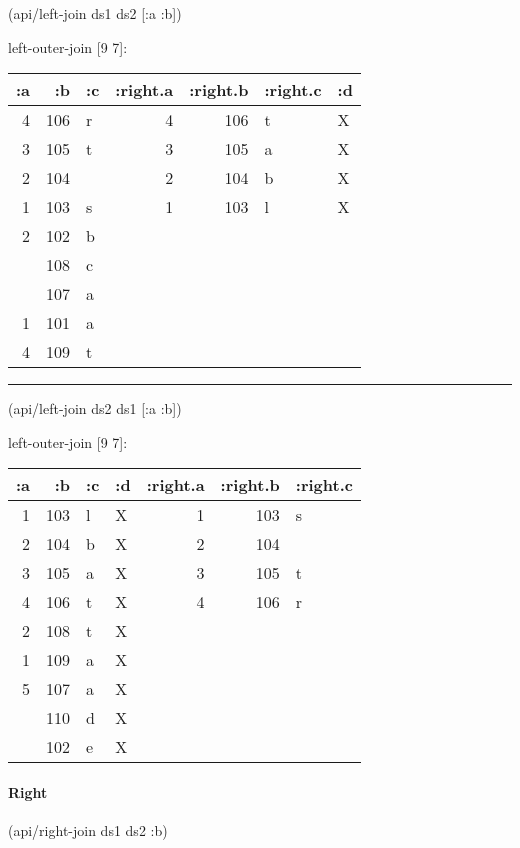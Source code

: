 \documentclass[]{article}
\newenvironment{Shaded}{\begin{snugshade}}{\end{snugshade}}
\newcommand{\AttributeTok}[1]{\textcolor[rgb]{0.77,0.63,0.00}{#1}}
\newcommand{\NormalTok}[1]{#1}
\let\oldparagraph\paragraph
\renewcommand{\paragraph}[1]{\oldparagraph{#1}\mbox{}}
\begin{document}
\begin{Shaded}
\begin{Highlighting}[]
\NormalTok{(api/left-join ds1 ds2 [}\AttributeTok{:a} \AttributeTok{:b}\NormalTok{])}
\end{Highlighting}
\end{Shaded}

left-outer-join {[}9 7{]}:

\begin{longtable}[]{@{}rrlrrll@{}}
\toprule
:a & :b & :c & :right.a & :right.b & :right.c & :d\tabularnewline
\midrule
\endhead
4 & 106 & r & 4 & 106 & t & X\tabularnewline
3 & 105 & t & 3 & 105 & a & X\tabularnewline
2 & 104 & & 2 & 104 & b & X\tabularnewline
1 & 103 & s & 1 & 103 & l & X\tabularnewline
2 & 102 & b & & & &\tabularnewline
& 108 & c & & & &\tabularnewline
& 107 & a & & & &\tabularnewline
1 & 101 & a & & & &\tabularnewline
4 & 109 & t & & & &\tabularnewline
\bottomrule
\end{longtable}

\begin{center}\rule{0.5\linewidth}{0.5pt}\end{center}

\begin{Shaded}
\begin{Highlighting}[]
\NormalTok{(api/left-join ds2 ds1 [}\AttributeTok{:a} \AttributeTok{:b}\NormalTok{])}
\end{Highlighting}
\end{Shaded}

left-outer-join {[}9 7{]}:

\begin{longtable}[]{@{}rrllrrl@{}}
\toprule
:a & :b & :c & :d & :right.a & :right.b & :right.c\tabularnewline
\midrule
\endhead
1 & 103 & l & X & 1 & 103 & s\tabularnewline
2 & 104 & b & X & 2 & 104 &\tabularnewline
3 & 105 & a & X & 3 & 105 & t\tabularnewline
4 & 106 & t & X & 4 & 106 & r\tabularnewline
2 & 108 & t & X & & &\tabularnewline
1 & 109 & a & X & & &\tabularnewline
5 & 107 & a & X & & &\tabularnewline
& 110 & d & X & & &\tabularnewline
& 102 & e & X & & &\tabularnewline
\bottomrule
\end{longtable}

\paragraph{Right}\label{right}

\begin{Shaded}
\begin{Highlighting}[]
\NormalTok{(api/right-join ds1 ds2 }\AttributeTok{:b}\NormalTok{)}
\end{Highlighting}
\end{Shaded}
\end{document}
